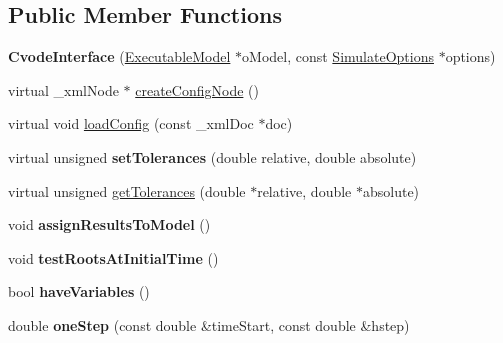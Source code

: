 \subsection*{Public Member Functions}
\begin{DoxyCompactItemize}
\item 
\hypertarget{classrr_1_1_cvode_interface_ad45a63d5dc86dda9e6c091058ad33a0d}{{\bfseries Cvode\-Interface} (\hyperlink{classrr_1_1_executable_model}{Executable\-Model} $\ast$o\-Model, const \hyperlink{structrr_1_1_simulate_options}{Simulate\-Options} $\ast$options)}\label{classrr_1_1_cvode_interface_ad45a63d5dc86dda9e6c091058ad33a0d}

\item 
virtual \-\_\-xml\-Node $\ast$ \hyperlink{classrr_1_1_cvode_interface_a87be8cba629eb3889644169b62d98ee7}{create\-Config\-Node} ()
\item 
virtual void \hyperlink{classrr_1_1_cvode_interface_a5bf99cc9287c287c0ffa0037c85444bc}{load\-Config} (const \-\_\-xml\-Doc $\ast$doc)
\item 
\hypertarget{classrr_1_1_cvode_interface_a79ca7994f93d4b28cbf7fc20f5c727fa}{virtual unsigned {\bfseries set\-Tolerances} (double relative, double absolute)}\label{classrr_1_1_cvode_interface_a79ca7994f93d4b28cbf7fc20f5c727fa}

\item 
virtual unsigned \hyperlink{classrr_1_1_cvode_interface_a046ed5392ee03ac41e83f8204e2fb7b2}{get\-Tolerances} (double $\ast$relative, double $\ast$absolute)
\item 
\hypertarget{classrr_1_1_cvode_interface_a34eaa1491cf3f94ae615d91174e29c75}{void {\bfseries assign\-Results\-To\-Model} ()}\label{classrr_1_1_cvode_interface_a34eaa1491cf3f94ae615d91174e29c75}

\item 
\hypertarget{classrr_1_1_cvode_interface_a780974e989df970d66969d202a7c07c2}{void {\bfseries test\-Roots\-At\-Initial\-Time} ()}\label{classrr_1_1_cvode_interface_a780974e989df970d66969d202a7c07c2}

\item 
\hypertarget{classrr_1_1_cvode_interface_ac0c1e13fab11adf0aa8c99e2edebc441}{bool {\bfseries have\-Variables} ()}\label{classrr_1_1_cvode_interface_ac0c1e13fab11adf0aa8c99e2edebc441}

\item 
\hypertarget{classrr_1_1_cvode_interface_a32cbb7db9b2bbec039e8c3625860f1e0}{double {\bfseries one\-Step} (const double \&time\-Start, const double \&hstep)}\label{classrr_1_1_cvode_interface_a32cbb7db9b2bbec039e8c3625860f1e0}


\end{DoxyCompactItemize}
